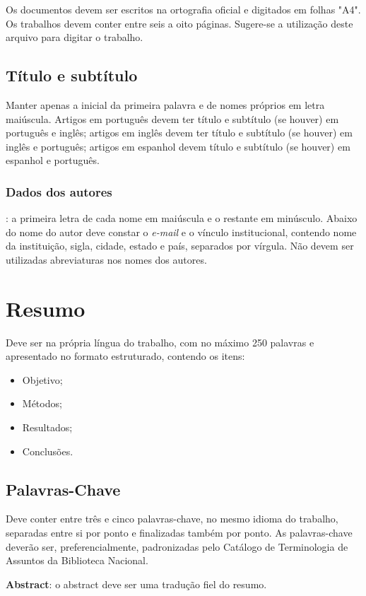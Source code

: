 \documentclass[a4,12pt]{modelo}
\begin{document}
Os documentos devem ser escritos na ortografia oficial e digitados em folhas "A4". Os trabalhos devem conter entre seis a oito páginas. Sugere-se a utilização deste arquivo para digitar o trabalho. 


\subsection{Título e subtítulo} 
Manter apenas a inicial da primeira palavra e de nomes próprios em letra maiúscula. Artigos em português devem ter título e subtítulo (se houver) em português e inglês; artigos em inglês devem ter título e subtítulo (se houver) em inglês e português; artigos em espanhol devem título e subtítulo (se houver) em espanhol e português.

\subsubsection{Dados dos autores}: a primeira letra de cada nome em maiúscula e o restante em minúsculo. Abaixo do nome do autor deve constar o \textit{e-mail} e o vínculo institucional, contendo nome da instituição, sigla, cidade, estado e país, separados por vírgula. Não devem ser utilizadas abreviaturas nos nomes dos autores. 

\section{Resumo} 
Deve ser na própria língua do trabalho, com no máximo 250 palavras e apresentado no formato estruturado, contendo os itens:  
\begin{itemize}
	\item Objetivo; 
	\item Métodos;
	\item Resultados; 
	\item Conclusões.
\end{itemize}

\subsection{Palavras-Chave}  
Deve conter entre três e cinco palavras-chave, no mesmo idioma do trabalho, separadas entre si por ponto e finalizadas também por ponto. As palavras-chave deverão ser, preferencialmente, padronizadas pelo Catálogo de Terminologia de Assuntos da Biblioteca Nacional. 
 
\textbf{Abstract}: o abstract deve ser uma tradução fiel do resumo.
 
\end{document}
